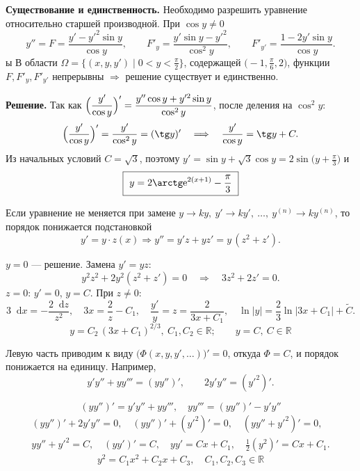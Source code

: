\documentclass[12pt,a4paper]{article}
\numberwithin{equation}{section}
\newcommand{\R}{\mathbb{R}}
\newcommand{\e}{\mathrm{e}}
\newcommand{\dd}{\mathop{}\!\mathrm{d}}
\begin{document}
\begin{exampleHSE}[\(y''\cos y+y'^2\sin y=y',\ y(-1)=\dfrac\pi6,\ y'(-1)=2\)]
\textbf{Существование и единственность.} Необходимо разрешить уравнение относительно старшей производной. При $\cos y\neq0$
\[
y''=F=\frac{y'-y'^2\sin y}{\cos y},\qquad
F'_y=\frac{y'\sin y-y'^2}{\cos^2y},\qquad
F'_{y'}=\frac{1-2y'\sin y}{\cos y}.
\]ы
В области $\Omega=\bigl\{(x,y,y')\mid 0<y<\frac\pi2\bigr\}$, содержащей $\bigl(-1,\frac\pi6,2\bigr)$, функции $F,F'_y,F'_{y'}$ непрерывны $\Longrightarrow$ решение существует и единственно.

\textbf{Решение.} Так как $\Bigl(\dfrac{y'}{\cos y}\Bigr)'=\dfrac{y''\cos y+y'^2\sin y}{\cos^2y}$, после деления на $\cos^2y$:
\[
\Bigl(\frac{y'}{\cos y}\Bigr)'=\frac{y'}{\cos^2y}=(\tg y)'\quad\Longrightarrow\quad\frac{y'}{\cos y}=\tg y+C.
\]
Из начальных условий $C=\sqrt3$, поэтому $y'=\sin y+\sqrt3\cos y=2\sin\bigl(y+\frac\pi3\bigr)$ и
\[
\boxed{\ y=2\arctg\e^{2(x+1)}-\frac\pi3\ }
\]
\end{exampleHSE}

\label{box:type17}
\begin{definitionHSE}
Если уравнение не меняется при замене $y\to ky,\ y'\to ky',\ \ldots,\ y^{(n)}\to ky^{(n)}$, то порядок понижается подстановкой
\[
y'=y\cdot z(x)\Longrightarrow y''=y'z+yz'=y\,(z^2+z').
\]
\end{definitionHSE}

\begin{exampleHSE}[\(y'^2+2yy''=0\)]
$y=0$ --- решение. Замена $y'=yz$:
\[
y^2z^2+2y^2(z^2+z')=0\quad\Longrightarrow\quad 3z^2+2z'=0.
\]
$z=0$: $y'=0$, $y=C$. При $z\neq0$:
\[
3\dd x=-\frac{2\dd z}{z^2},\quad 3x=\frac2z-C_1,\quad \frac{y'}{y}=z=\frac{2}{3x+C_1},\quad \ln|y|=\frac23\ln|3x+C_1|+\widetilde C.
\]
\[
\boxed{\ y=C_2\,(3x+C_1)^{2/3},\ C_1,C_2\in\R;\qquad y=C,\ C\in\R\ }
\]
\end{exampleHSE}

\label{box:type18}
\begin{definitionHSE}
Левую часть приводим к виду $\bigl(\Phi(x,y,y',\ldots)\bigr)'=0$, откуда $\Phi=C$, и порядок понижается на единицу. Например,
\[
y'y''+yy'''=(yy'')',\qquad 2y'y''=(y'^2)'.
\]
\end{definitionHSE}

\begin{exampleHSE}[\(yy'''+3y'y''=0\)]
\[(yy'')'=y'y''+yy''',\quad yy'''=(yy'')'-y'y''\]
\begin{gather*}
(yy'')'+2y'y''=0,\quad (yy'')'+(y'^2)'=0,\quad (yy''+y'^2)'=0,\\
yy''+y'^2=C,\quad (yy')'=C,\quad yy'=Cx+C_1,\quad \frac12(y^2)'=Cx+C_1.
\end{gather*}
\[
\boxed{\ y^2=C_1x^2+C_2x+C_3,\quad C_1,C_2,C_3\in\R\ }
\]
\end{exampleHSE}
\end{document}
